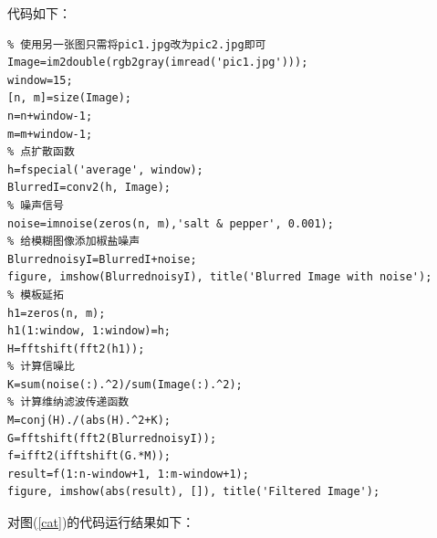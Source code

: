 \documentclass[UTF8]{ctexart}
\begin{document}
    \clearpage
    代码如下：
    \begin{lstlisting}
% 使用另一张图只需将pic1.jpg改为pic2.jpg即可
Image=im2double(rgb2gray(imread('pic1.jpg')));
window=15;
[n, m]=size(Image);
n=n+window-1;
m=m+window-1;
% 点扩散函数
h=fspecial('average', window);
BlurredI=conv2(h, Image);
% 噪声信号
noise=imnoise(zeros(n, m),'salt & pepper', 0.001);
% 给模糊图像添加椒盐噪声
BlurrednoisyI=BlurredI+noise;
figure, imshow(BlurrednoisyI), title('Blurred Image with noise');
% 模板延拓
h1=zeros(n, m);
h1(1:window, 1:window)=h;
H=fftshift(fft2(h1));
% 计算信噪比
K=sum(noise(:).^2)/sum(Image(:).^2);
% 计算维纳滤波传递函数
M=conj(H)./(abs(H).^2+K);
G=fftshift(fft2(BlurrednoisyI));
f=ifft2(ifftshift(G.*M));
result=f(1:n-window+1, 1:m-window+1);
figure, imshow(abs(result), []), title('Filtered Image');
    \end{lstlisting}
    \clearpage
    对图(\ref{cat})的代码运行结果如下：
\end{document}
